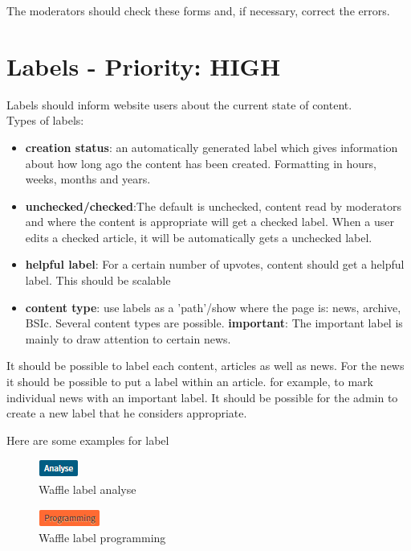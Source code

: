 The moderators should check these forms and, if necessary, correct the errors.


\section{Labels - Priority: HIGH}
 
\begin{tcolorbox}[breakable,colback=red!14,colframe=red!40!black,title=UPDATE 30/11/2017]
Labels should inform website users about the current state of content. 
\\
Types of labels:
\begin{itemize}
    \item \textbf{creation status}: an automatically generated label which gives information about how long ago the content has been created. Formatting in hours, weeks, months and years.
    \item \textbf{unchecked/checked}:The default is unchecked, content read by moderators and where the content is appropriate will get a checked label. When a user edits a checked article, it will be automatically gets a unchecked label. 
    \item \textbf{helpful label}: For a certain number of upvotes, content should get a helpful label. This should be scalable
    \item \textbf{content type}: use labels as a 'path'/show where the page is: news, archive, BSIc. Several content types are possible.
    \itme \textbf{important}: The important label is mainly to draw attention to certain news.
\end{itemize}

It should be possible to label each content, articles as well as news. For the news it should be possible to put a label within an article. for example, to mark individual news with an important label. It should be possible for the admin to create a new label that he considers appropriate.


\end{tcolorbox}

Here are some examples for label
\begin{figure}[h] 
    \centering
    \includegraphics[scale=1.0]{Pictures/label1}
    \caption{Waffle label analyse}
\end{figure} 
\begin{figure}[h] 
    \centering
    \includegraphics[scale=1.0]{Pictures/label2}
    \caption{Waffle label programming}
\end{figure}

